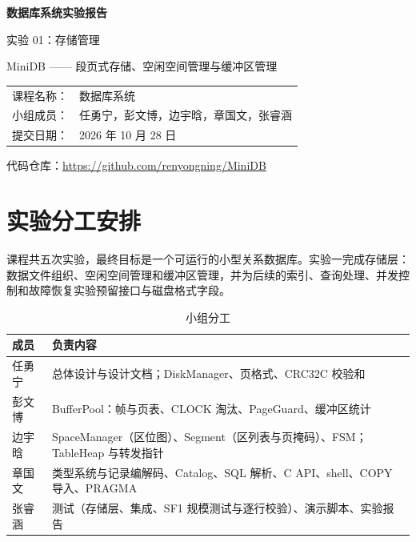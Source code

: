 \documentclass[11pt,a4paper]{ctexart}
\begin{document}
\begin{titlepage}
  \centering
  \vspace*{3cm}
  {\Huge\bfseries 数据库系统实验报告\par}
  \vspace{1cm}
  {\LARGE 实验 01：存储管理\par}
  \vspace{0.6cm}
  {\large MiniDB —— 段页式存储、空闲空间管理与缓冲区管理\par}
  \vspace{3cm}
  \begin{tabular}{rl}
    课程名称： & 数据库系统 \\[4pt]
    小组成员： & 任勇宁，彭文博，边宇晗，章国文，张睿涵 \\[4pt]
    提交日期： & 2026 年 10 月 28 日 \\
  \end{tabular}
  \vfill
  {\small 代码仓库：\url{https://github.com/renyongning/MiniDB}\par}
\end{titlepage}

\tableofcontents
\newpage

\section{实验分工安排}

课程共五次实验，最终目标是一个可运行的小型关系数据库。实验一完成存储层：数据文件组织、空闲空间管理和缓冲区管理，并为后续的索引、查询处理、并发控制和故障恢复实验预留接口与磁盘格式字段。

\begin{table}[H]
  \centering
  \caption{小组分工}
  \begin{tabularx}{\textwidth}{l X}
    \toprule
    成员 & 负责内容 \\
    \midrule
    任勇宁 & 总体设计与设计文档；DiskManager、页格式、CRC32C 校验和 \\
    彭文博 & BufferPool：帧与页表、CLOCK 淘汰、PageGuard、缓冲区统计 \\
    边宇晗 & SpaceManager（区位图）、Segment（区列表与页掩码）、FSM；TableHeap 与转发指针 \\
    章国文 & 类型系统与记录编解码、Catalog、SQL 解析、C API、shell、COPY 导入、PRAGMA \\
    张睿涵 & 测试（存储层、集成、SF1 规模测试与逐行校验）、演示脚本、实验报告 \\
    \bottomrule
  \end{tabularx}
\end{table}
\end{document}

